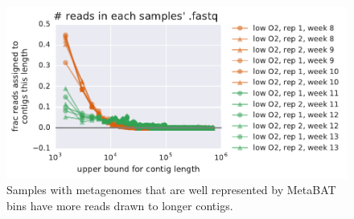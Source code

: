 \begin{figure}[H]
\centering
    \includegraphics[width=1.0\textwidth]{./tex/chapter2/figures/170124_bad_low_o2_samples_have_more_reads_on_short_contigs--binning_not_considered.pdf}
    \begin{singlespace}
    \caption[Samples best explained by bins have more reads drawn to longer contigs]{
        Samples with metagenomes that are well represented by MetaBAT bins have more reads drawn to longer contigs.}
    \label{fig:contig_dist}
    \end{singlespace}
\end{figure}

